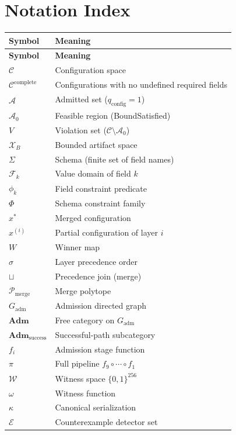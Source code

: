 \documentclass[12pt, letterpaper]{report}
\theoremstyle{plain}
\theoremstyle{definition}
\theoremstyle{remark}
\newcommand{\CC}{\mathcal{C}}
\newcommand{\W}{\mathcal{W}}
\newcommand{\EE}{\mathcal{E}}
\newcommand{\PP}{\mathcal{P}}
\newcommand{\qc}{q_{\mathrm{config}}}
\begin{document}
\chapter{Notation Index}
\label{app:notation}

\begin{longtable}{@{}lp{10cm}@{}}
\toprule
\textbf{Symbol} & \textbf{Meaning} \\
\midrule
\endfirsthead
\toprule \textbf{Symbol} & \textbf{Meaning} \\ \midrule
\endhead
$\CC$ & Configuration space \\
$\CC^{\mathrm{complete}}$ & Configurations with no undefined required fields \\
$\mathcal{A}$ & Admitted set ($\qc = 1$) \\
$\mathcal{A}_0$ & Feasible region (BoundSatisfied) \\
$V$ & Violation set ($\CC \setminus \mathcal{A}_0$) \\
$\mathcal{X}_B$ & Bounded artifact space \\
$\Sigma$ & Schema (finite set of field names) \\
$\mathcal{F}_k$ & Value domain of field $k$ \\
$\phi_k$ & Field constraint predicate \\
$\Phi$ & Schema constraint family \\
$x^*$ & Merged configuration \\
$x^{(i)}$ & Partial configuration of layer $i$ \\
$W$ & Winner map \\
$\sigma$ & Layer precedence order \\
$\sqcup$ & Precedence join (merge) \\
$\PP_{\mathrm{merge}}$ & Merge polytope \\
$G_{\mathrm{adm}}$ & Admission directed graph \\
$\mathbf{Adm}$ & Free category on $G_{\mathrm{adm}}$ \\
$\mathbf{Adm}_{\mathrm{success}}$ & Successful-path subcategory \\
$f_i$ & Admission stage function \\
$\pi$ & Full pipeline $f_9 \circ \cdots \circ f_1$ \\
$\W$ & Witness space $\{0,1\}^{256}$ \\
$\omega$ & Witness function \\
$\kappa$ & Canonical serialization \\
$\EE$ & Counterexample detector set \\

\end{longtable}
\end{document}
